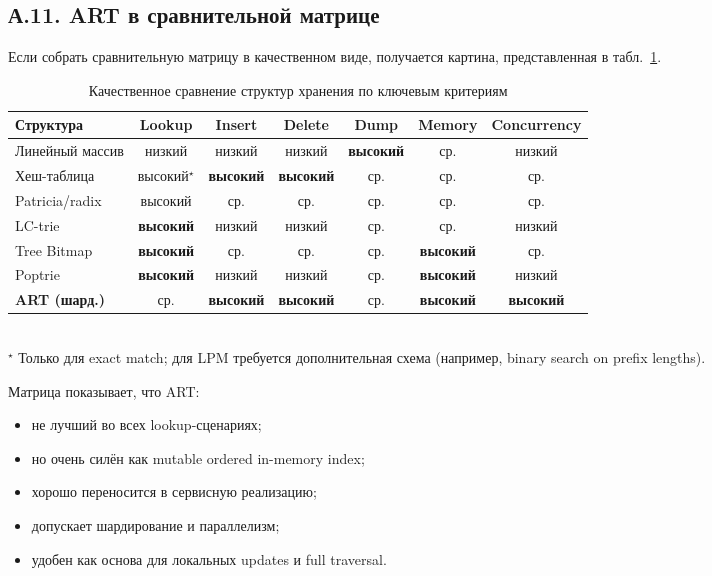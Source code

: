 \subsection*{А.11. ART в сравнительной матрице}

Если собрать сравнительную матрицу в качественном виде, получается
картина, представленная в табл.~\ref{tab:lpm-matrix}.

\begin{table}[ht]
\centering
\caption{Качественное сравнение структур хранения по ключевым критериям}
\label{tab:lpm-matrix}
\small
\begin{tabular}{>{\raggedright\arraybackslash}p{3.0cm}cccccc}
\toprule
Структура         & Lookup & Insert & Delete & Dump  & Memory & Concurrency \\
\midrule
Линейный массив   & низкий & низкий & низкий & \textbf{высокий} & ср.   & низкий \\
Хеш-таблица       & высокий$^{\star}$ & \textbf{высокий} & \textbf{высокий} & ср.   & ср.    & ср.    \\
Patricia/radix    & высокий & ср.    & ср.    & ср.   & ср.    & ср.    \\
LC-trie           & \textbf{высокий} & низкий & низкий & ср.   & ср.    & низкий \\
Tree Bitmap       & \textbf{высокий} & ср.    & ср.    & ср.   & \textbf{высокий} & ср. \\
Poptrie           & \textbf{высокий} & низкий & низкий & ср.   & \textbf{высокий} & низкий \\
\textbf{ART (шард.)} & ср.   & \textbf{высокий} & \textbf{высокий} & ср.   & \textbf{высокий} & \textbf{высокий} \\
\bottomrule
\end{tabular}\\[2pt]
{\footnotesize $^{\star}$ Только для exact match; для LPM требуется
дополнительная схема (например, binary search on prefix lengths).}
\end{table}

Матрица показывает, что ART:

\begin{itemize}
\item не лучший во всех lookup-сценариях;
\item но очень силён как mutable ordered in-memory index;
\item хорошо переносится в сервисную реализацию;
\item допускает шардирование и параллелизм;
\item удобен как основа для локальных updates и full traversal.
\end{itemize}

